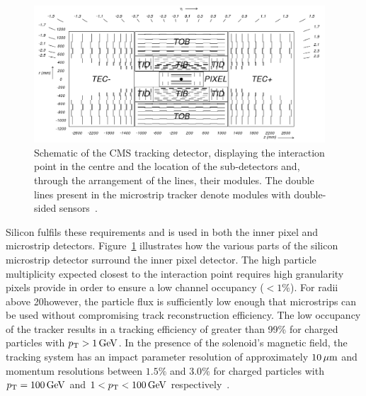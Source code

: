 \begin{figure}[htb]
\begin{center}
\includegraphics[width=0.97\textwidth]{figs/cms/fig_cmstracker.png}
\caption{Schematic of the CMS tracking detector, displaying the interaction point in the centre and the location of the sub-detectors and, through the arrangement of the lines, their modules. The double lines present in the microstrip tracker denote modules with double-sided sensors~\cite{Sprenger:2010ss}.}
\label{fig:tracker}
\end{center}
\end{figure}

Silicon fulfils these requirements and is used in both the inner pixel and microstrip detectors.
Figure~\ref{fig:tracker} illustrates how the various parts of the silicon microstrip detector surround the inner pixel detector.
The high particle multiplicity expected closest to the interaction point requires high granularity pixels provide in order to ensure a low channel occupancy ($< 1\%$).
For radii above 20\cm however, the particle flux is sufficiently low enough that microstrips can be used without compromising track reconstruction efficiency.
The low occupancy of the tracker results in a tracking efficiency of greater than 99\% for charged particles with $p_{\mathrm{T}} > 1 \,\text{Ge\hspace{-.08em}V}$.
In the presence of the solenoid's magnetic field, the tracking system has an impact parameter resolution of approximately $10\,\mu\text{m}$ and momentum resolutions between $1.5\%$ and $3.0\%$ for charged particles with $p_{\mathrm{T}} = 100\,\text{Ge\hspace{-.08em}V}$ and $1 < p_{\mathrm{T}} < 100\,\text{Ge\hspace{-.08em}V}$ respectively~\cite{Khachatryan:2010pw,Chatrchyan:2014fea}.


